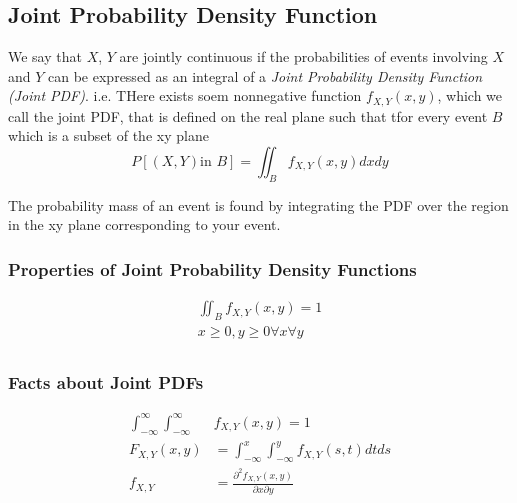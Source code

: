 	\subsection[Joint PDF]{Joint Probability Density Function} \label{subsec:Joint PDF}
		\begin{definition} \label{def:Joint PDF}
			We say that $X$, $Y$ are jointly continuous if the probabilities of events involving $X$ and $Y$ can be expressed as an integral of a \emph{Joint Probability Density Function (Joint PDF)}. \newline
			i.e. THere exists soem nonnegative function $f_{X,Y} \left( x,y \right)$, which we call the joint PDF, that is defined on the real plane such that tfor every event $B$ which is a subset of the xy plane
			\begin{equation}\label{eq:Joint PDF}
				P \left[ \left( X,Y \right) \text{in } B \right] = \iint_{B} f_{X,Y} \left( x,y \right) dx dy
			\end{equation}
			\begin{remark}
				The probability mass of an event is found by integrating the PDF over the region in the xy plane corresponding to your event.
			\end{remark}
		\end{definition}
	
		\subsubsection{Properties of Joint Probability Density Functions} \label{subsubsec:Joint PDF Properties}
			\begin{gather}
				\iint_{B} f_{X,Y} \left( x,y \right) = 1 \\
				x \geq 0, y \geq 0 \forall x \forall y \\
			\end{gather}
			
		\subsubsection{Facts about Joint PDFs} \label{subsubsec:Joint PDF Facts}
			\begin{align}
				\int_{-\infty}^{\infty} \int_{-\infty}^{\infty} &f_{X,Y} \left( x,y \right) = 1 \\
				F_{X,Y} \left( x,y \right) &= \int_{-\infty}^{x} \int_{-\infty}^{y} f_{X,Y} \left( s,t \right) dt ds \\
				f_{X,Y} &= \frac{\partial^{2} f_{X,Y} \left( x,y \right)}{\partial x \partial y} \\
			\end{align}
			
